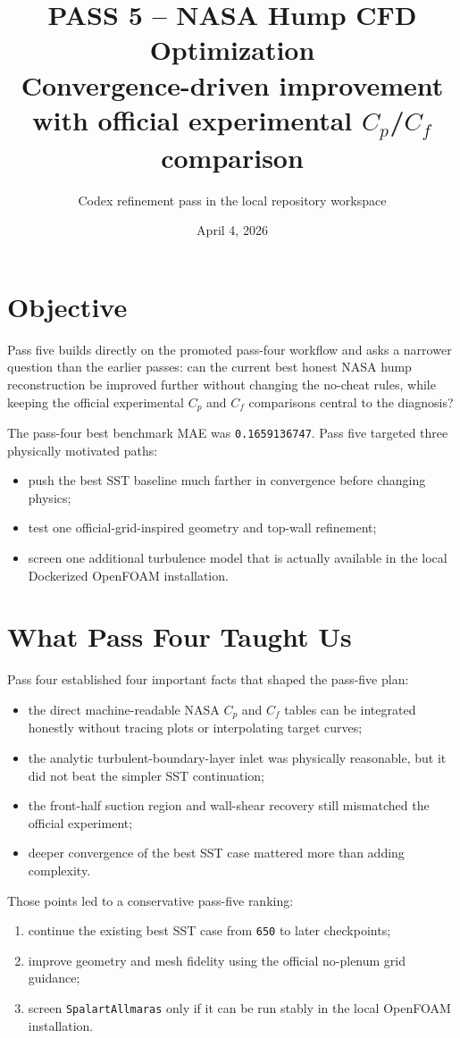 \documentclass[11pt]{article}
\title{PASS 5 -- NASA Hump CFD Optimization\\\large Convergence-driven improvement with official experimental \(C_p\)/\(C_f\) comparison}
\author{Codex refinement pass in the local repository workspace}
\date{April 4, 2026}
\begin{document}
\setlength{\emergencystretch}{3em}
\maketitle

\section{Objective}
Pass five builds directly on the promoted pass-four workflow and asks a narrower question than the earlier passes: can the current best honest NASA hump reconstruction be improved further without changing the no-cheat rules, while keeping the official experimental \(C_p\) and \(C_f\) comparisons central to the diagnosis?

The pass-four best benchmark MAE was \texttt{0.1659136747}. Pass five targeted three physically motivated paths:
\begin{itemize}
\item push the best SST baseline much farther in convergence before changing physics;
\item test one official-grid-inspired geometry and top-wall refinement;
\item screen one additional turbulence model that is actually available in the local Dockerized OpenFOAM installation.
\end{itemize}

\section{What Pass Four Taught Us}
Pass four established four important facts that shaped the pass-five plan:
\begin{itemize}
\item the direct machine-readable NASA \(C_p\) and \(C_f\) tables can be integrated honestly without tracing plots or interpolating target curves;
\item the analytic turbulent-boundary-layer inlet was physically reasonable, but it did not beat the simpler SST continuation;
\item the front-half suction region and wall-shear recovery still mismatched the official experiment;
\item deeper convergence of the best SST case mattered more than adding complexity.
\end{itemize}

Those points led to a conservative pass-five ranking:
\begin{enumerate}
\item continue the existing best SST case from \texttt{650} to later checkpoints;
\item improve geometry and mesh fidelity using the official no-plenum grid guidance;
\item screen \texttt{SpalartAllmaras} only if it can be run stably in the local OpenFOAM installation.
\end{enumerate}
\end{document}
